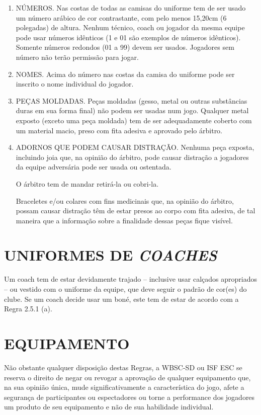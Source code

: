\begin{enumerate}[label=(\alph*)]
\item  NÚMEROS. Nas costas de todas as camisas do uniforme tem de ser usado um número arábico de cor contrastante, com pelo menos 15,20cm (6 polegadas) de altura. Nenhum técnico, \gls{coach} ou jogador da mesma equipe pode usar números idênticos (1 e 01 são exemplos de números idênticos). Somente  números redondos (01 a 99) devem ser usados. Jogadores sem número não terão permissão para jogar.

\item  NOMES. Acima do número nas costas da camisa do uniforme pode ser inscrito o nome individual do jogador.

\item  PEÇAS MOLDADAS. Peças moldadas (gesso, metal ou outras substâncias duras em sua forma final) não podem ser usadas num jogo. Qualquer metal exposto (exceto uma peça moldada) tem de ser adequadamente coberto com um material macio, preso com fita adesiva e aprovado pelo árbitro.

\item   ADORNOS QUE PODEM CAUSAR DISTRAÇÃO. Nenhuma peça exposta, incluindo joia que, na opinião do árbitro, pode causar distração a jogadores da  equipe adversária pode ser usada ou ostentada.

  O árbitro tem de mandar retirá-la ou cobri-la.

  Braceletes e/ou colares com fins medicinais que, na opinião do árbitro, possam causar distração têm de estar presos ao corpo com fita adesiva, de tal maneira que a informação sobre a finalidade dessas peças fique visível.

   \end{enumerate}


\section{UNIFORMES DE \textit{COACHES}}
 Um \gls{coach} tem de estar devidamente trajado -- inclusive usar calçados apropriados -- ou vestido com o uniforme da equipe, que deve seguir o padrão de cor(es) do clube. Se um \gls{coach} decide usar um boné, este tem de estar de acordo com a Regra 2.5.1 (a).

\section{EQUIPAMENTO}

Não obstante qualquer disposição destas Regras, a WBSC-SD ou ISF \gls{ESC} se reserva o direito de negar ou revogar a  aprovação de qualquer equipamento que, na sua opinião única, mude significativamente a característica do jogo, afete a segurança de participantes ou espectadores ou torne a performance dos jogadores um produto de seu equipamento e não de sua habilidade individual.

